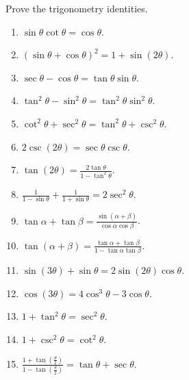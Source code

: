 Prove the trigonometry identities.
\begin{multicols}{3}
\begin{enumerate}
\item $\displaystyle \sin \theta\cot \theta =\cos \theta$.
\item $\displaystyle (\sin \theta +\cos \theta)^2=1+\sin(2\theta)$.
\item $\displaystyle \sec \theta - \cos \theta= \tan \theta \sin \theta$.
\item $\displaystyle \tan^2 \theta-\sin^2 \theta=\tan^2\theta\sin^2\theta$.
\item $\displaystyle \cot^2\theta+\sec^2\theta=\tan^2\theta+\csc^2\theta$.
\item $\displaystyle 2\csc (2\theta)= \sec \theta \csc \theta$.
\item $\displaystyle \tan (2\theta) =\frac{2\tan \theta}{1-\tan^2\theta} $.
\item $\displaystyle \frac{1}{1-\sin \theta}+ \frac{1}{1+\sin \theta}=2\sec^2\theta$.
\item $\displaystyle \tan \alpha + \tan \beta = \frac{\sin (\alpha+\beta)}{\cos \alpha \cos \beta}$.
\item $\displaystyle \tan (\alpha+\beta)= \frac{\tan \alpha +\tan \beta}{1-\tan \alpha\tan \beta}$.
\item $\displaystyle \sin (3\theta) +\sin \theta = 2 \sin (2\theta ) \cos \theta $.
\item $\displaystyle \cos (3\theta) = 4\cos^3\theta-3\cos \theta $.
\item $\displaystyle 1+\tan^2\theta = \sec^2\theta$.
\item $\displaystyle 1+\csc^2\theta = \cot^2\theta$.
\item $\displaystyle \frac{1+\tan \left(\frac{\theta}{2} \right) } {1 -\tan \left(\frac{\theta}{2}\right)}= \tan \theta +\sec \theta$.
\end{enumerate} 
\end{multicols}
